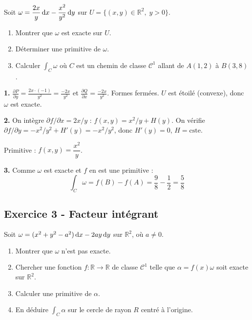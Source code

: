\documentclass[12pt,a4paper]{article}
\begin{document}
\begin{boiteexercice}
Soit $\omega = \dfrac{2x}{y}\,\mathrm{d} x - \dfrac{x^2}{y^2}\,\mathrm{d} y$ sur $U=\{(x,y)\in\mathbb{R}^2,\;y>0\}$.
\begin{enumerate}
  \item Montrer que $\omega$ est exacte sur $U$.
  \item Déterminer une primitive de $\omega$.
  \item Calculer $\int_C \omega$ où $C$ est un chemin de classe $\mathcal{C}^1$ allant de $A(1,2)$ à $B(3,8)$.
\end{enumerate}
\end{boiteexercice}

\begin{boitecorrige}
\textbf{1.} $\frac{\partial P}{\partial y} = \frac{2x \cdot (-1)}{y^2} = \frac{-2x}{y^2}$ et $\frac{\partial Q}{\partial x} = \frac{-2x}{y^2}$. Formes fermées. $U$ est étoilé (convexe), donc $\omega$ est exacte.

\textbf{2.} On intègre $\partial f/\partial x = 2x/y$ : $f(x,y) = x^2/y + H(y)$. On vérifie $\partial f/\partial y = -x^2/y^2 + H'(y) = -x^2/y^2$, donc $H'(y)=0$, $H=\text{cste}$.

Primitive : $f(x,y) = \dfrac{x^2}{y}$.

\textbf{3.} Comme $\omega$ est exacte et $f$ en est une primitive :
\[
\int_C \omega = f(B) - f(A) = \frac{9}{8} - \frac{1}{2} = \frac{5}{8}
\]
\end{boitecorrige}

\subsection*{Exercice 3 - Facteur intégrant \niveau{\moyen}}

\begin{boiteexercice}
Soit $\omega = (x^2+y^2-a^2)\,\mathrm{d} x - 2ay\,\mathrm{d} y$ sur $\mathbb{R}^2$, où $a\neq0$.
\begin{enumerate}
  \item Montrer que $\omega$ n'est pas exacte.
  \item Chercher une fonction $f:\mathbb{R}\to\mathbb{R}$ de classe $\mathcal{C}^1$ telle que $\alpha = f(x)\omega$ soit exacte sur $\mathbb{R}^2$.
  \item Calculer une primitive de $\alpha$.
  \item En déduire $\int_C \alpha$ sur le cercle de rayon $R$ centré à l'origine.
\end{enumerate}
\end{boiteexercice}
\end{document}
